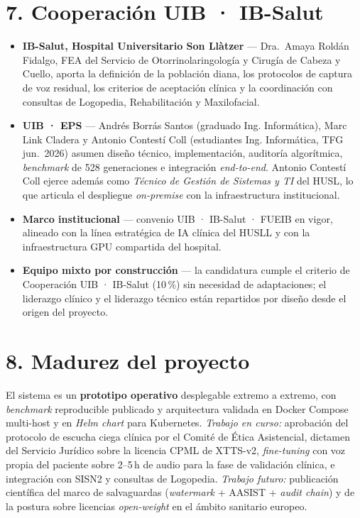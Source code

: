 \documentclass[11pt,a4paper]{article}
\begin{document}
\section*{7. Cooperación UIB · IB-Salut}

\begin{itemize}[leftmargin=1.2em, itemsep=1pt, topsep=1pt]
\item \textbf{IB-Salut, Hospital Universitario Son Llàtzer} --- Dra.~Amaya Roldán Fidalgo, FEA del Servicio de Otorrinolaringología y Cirugía de Cabeza y Cuello, aporta la definición de la población diana, los protocolos de captura de voz residual, los criterios de aceptación clínica y la coordinación con consultas de Logopedia, Rehabilitación y Maxilofacial.
\item \textbf{UIB · EPS} --- Andrés Borrás Santos (graduado Ing. Informática), Marc Link Cladera y Antonio Contestí Coll (estudiantes Ing. Informática, TFG jun.~2026) asumen diseño técnico, implementación, auditoría algorítmica, \emph{benchmark} de 528 generaciones e integración \emph{end-to-end}. Antonio Contestí Coll ejerce además como \emph{Técnico de Gestión de Sistemas y TI} del HUSL, lo que articula el despliegue \emph{on-premise} con la infraestructura institucional.
\item \textbf{Marco institucional} --- convenio UIB · IB-Salut · FUEIB en vigor, alineado con la línea estratégica de IA clínica del HUSLL y con la infraestructura GPU compartida del hospital.
\item \textbf{Equipo mixto por construcción} --- la candidatura cumple el criterio de Cooperación UIB · IB-Salut (10\,\%) sin necesidad de adaptaciones; el liderazgo clínico y el liderazgo técnico están repartidos por diseño desde el origen del proyecto.
\end{itemize}

\section*{8. Madurez del proyecto}

El sistema es un \textbf{prototipo operativo} desplegable extremo a extremo, con \emph{benchmark} reproducible publicado y arquitectura validada en Docker Compose multi-host y en \emph{Helm chart} para Kubernetes. \emph{Trabajo en curso:} aprobación del protocolo de escucha ciega clínica por el Comité de Ética Asistencial, dictamen del Servicio Jurídico sobre la licencia CPML de XTTS-v2, \emph{fine-tuning} con voz propia del paciente sobre 2--5\,h de audio para la fase de validación clínica, e integración con SISN2 y consultas de Logopedia. \emph{Trabajo futuro:} publicación científica del marco de salvaguardas (\emph{watermark} + AASIST + \emph{audit chain}) y de la postura sobre licencias \emph{open-weight} en el ámbito sanitario europeo.
\end{document}
